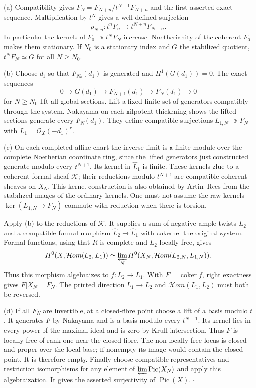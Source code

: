 \documentclass[11pt]{article}
\let\chapterexercise\exercise
\renewcommand{\exercise}[2]{\Needspace{8\baselineskip}\chapterexercise{#1}{#2}}
\begin{document}
\pf (a) Compatibility gives $F_N=F_{N+n}/t^{N+1}F_{N+n}$ and the first asserted exact sequence. Multiplication by $t^N$ gives a well-defined surjection
\[ \rho_{N,n}:t^nF_n\longrightarrow t^{N+n}F_{N+n}. \]
In particular the kernels of $F_0\twoheadrightarrow t^NF_N$ increase. Noetherianity of the coherent $F_0$ makes them stationary. If $N_0$ is a stationary index and $G$ the stabilized quotient, $t^NF_N\simeq G$ for all $N\ge N_0$.

(b) Choose $d_1$ so that $F_{N_0}(d_1)$ is generated and $H^1(G(d_1))=0$. The exact sequences
\[ 0\to G(d_1)\to F_{N+1}(d_1)\to F_N(d_1)\to0 \]
for $N\ge N_0$ lift all global sections. Lift a fixed finite set of generators compatibly through the system. Nakayama on each nilpotent thickening shows the lifted sections generate every $F_N(d_1)$. They define compatible surjections $L_{1,N}\twoheadrightarrow F_N$ with $L_1=\mathcal O_X(-d_1)^r$.

(c) On each completed affine chart the inverse limit is a finite module over the complete Noetherian coordinate ring, since the lifted generators just constructed generate modulo every $t^{N+1}$. Its kernel in $\widehat L_1$ is finite. These kernels glue to a coherent formal sheaf $\mathcal K$; their reductions modulo $t^{N+1}$ are compatible coherent sheaves on $X_N$. This kernel construction is also obtained by Artin--Rees from the stabilized images of the ordinary kernels. One must not assume the raw kernels $\ker(L_{1,N}\to F_N)$ commute with reduction when there is torsion.

Apply (b) to the reductions of $\mathcal K$. It supplies a sum of negative ample twists $L_2$ and a compatible formal morphism $\widehat L_2\to\widehat L_1$ with cokernel the original system. Formal functions, using that $R$ is complete and $L_2$ locally free, gives
\[ H^0(X,\mathcal Hom(L_2,L_1))
\simeq\varprojlim_N H^0(X_N,\mathcal Hom(L_{2,N},L_{1,N})). \]
Thus this morphism algebraizes to $f:L_2\to L_1$. With $F=\operatorname{coker}f$, right exactness gives $F|X_N=F_N$. The printed direction $L_1\to L_2$ and $\mathcal Hom(L_1,L_2)$ must both be reversed.

(d) If all $F_N$ are invertible, at a closed-fibre point choose a lift of a basis modulo $t$. It generates $F$ by Nakayama and is a basis modulo every $t^{N+1}$. Its kernel lies in every power of the maximal ideal and is zero by Krull intersection. Thus $F$ is locally free of rank one near the closed fibre. The non-locally-free locus is closed and proper over the local base; if nonempty its image would contain the closed point. It is therefore empty. Finally choose compatible representatives and restriction isomorphisms for any element of $\varprojlim\operatorname{Pic}(X_N)$ and apply this algebraization. It gives the asserted surjectivity of $\operatorname{Pic}(X)$. \hfill$\square$
\end{document}
